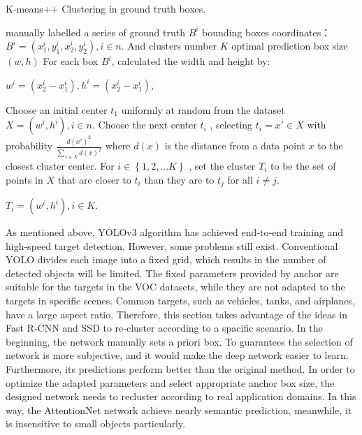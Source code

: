 \begin{algorithm}[h]
  \caption{K‐means++ Clustering in ground truth boxes.}
  \label{alg:Framwork}
  \begin{algorithmic}[1]
    \Require
    manually labelled a series of ground truth $B^{i}$ bounding boxes coordinates：
     $B^{i}=\left ( x_{1}^{i},y_{1}^{i},x_{2}^{i},y_{2}^{i} \right ), i\in n.$ And clusters number $K$
    \Ensure
    optimal  prediction box size $\left ( w,h \right )$
    \State For each box $B^{i}$, calculated the width and height by:
    
    $w^{i}=(x_{2}^{i}-x_{1}^{i}), h^{i}=(x_{2}^{i}-x_{1}^{i})$, 
    
    \State Choose an initial center $t_{1}$ uniformly at random from the dataset $X=(w^{i},h^{i}),i\in n$.
       \State Choose the next center $t_{i}$ , selecting $t_{i}={x}'\in X $ with probability $\frac{d ( {x}')^{2}}{\sum_{x\in X}^{}d\left ( x \right )^{2} }$
where $d\left ( x \right )$ is the distance from a data point $x$ to the closest cluster center.
       \State For $i \in \left \{ 1,2,...K \right \}$ , set the cluster $T_{i}$ to be the set of points in $X$ that are closer to
$t_{i}$ than they are to $t_{j}$ for all $i\neq j$.
    
  
    \Return $T_{i}=(w^{i},h^{i}),i \in K$.
  \end{algorithmic}
\end{algorithm}

As mentioned above, YOLOv3 algorithm has achieved end‐to‐end training and high‐speed target detection. However, some problems still exist. Conventional YOLO divides each image into a fixed grid, which results in the number of detected objects will be limited. The fixed parameters provided by anchor are suitable for the targets in the VOC datasets, while they are not adapted to the targets in specific scenes. Common targets, such as vehicles, tanks, and airplanes, have a large aspect ratio. Therefore, this section takes advantage of the ideas in Fast R‐CNN and SSD to re‐cluster according to a spacific scenario. In the beginning, the network manually sets a priori box. To guarantees the selection of network is more subjective, and it would make the deep network easier to learn. Furthermore, its predictions perform better than the original method. In order to optimize the adapted parameters and select appropriate anchor box size, the designed network needs to recluster according to real application domains. In this way, the AttentionNet network achieve nearly semantic prediction, meanwhile, it is insensitive to small objects particularly.




